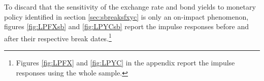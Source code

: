 \documentclass[a4paper, 12pt]{article}
\begin{document}
To discard that the sensitivity of the exchange rate and bond yields to monetary policy identified in section \ref{sec:sbreaksfxyc} is only an on-impact phenomenon, figures \ref{fig:LPFXsb} and \ref{fig:LPYCsb} report the impulse responses before and after their respective break dates.\footnote{Figures \ref{fig:LPFX} and \ref{fig:LPYC} in the appendix report the impulse responses using the whole sample.} 

\end{document}
